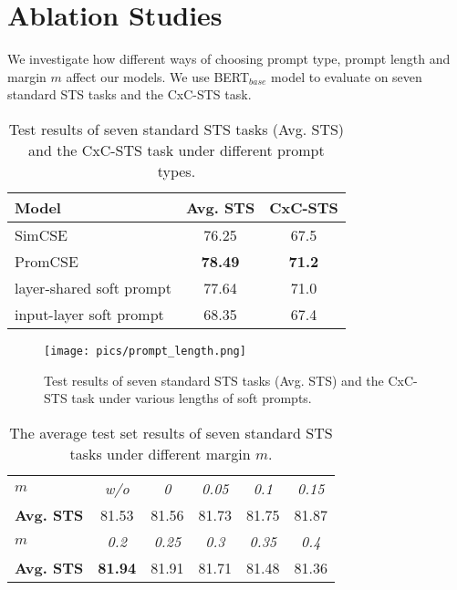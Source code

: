 \documentclass[11pt]{article}
\begin{document}
\section{Ablation Studies}
\label{sec: ablation}
We investigate how different ways of choosing prompt type, prompt length and margin $m$ affect our models. We use BERT$_{base}$ model to evaluate on seven standard STS tasks and the CxC-STS task.

\begin{table}[t]
\small
\centering
\begin{tabular}{lcc}
\toprule
\textbf{Model} &  \textbf{Avg. STS}  &  \textbf{CxC-STS}  \\
\midrule
SimCSE  & 76.25 & 67.5 \\
\midrule
PromCSE  & \textbf{78.49} & \textbf{71.2} \\
\quad  layer-shared soft prompt  & 77.64 & 71.0 \\
\quad  input-layer soft prompt & 68.35 & 67.4 \\
\bottomrule
\end{tabular}
\caption{\label{tab: prompt type}
Test results of seven standard STS tasks (Avg. STS) and the CxC-STS task under different prompt types.
}
\end{table}

\begin{figure}[htp]
	\centering 
	\texttt{[image: pics/prompt\_length.png]}
	\caption{Test results of seven standard STS tasks (Avg. STS) and the CxC-STS task under various lengths of soft prompts.}
	\label{fig: prompt length}
\end{figure}

\begin{table}[t]
\small
\centering
\begin{tabular}{lccccc}
\toprule
$m$ & \textit{w/o} & \textit{0} & \textit{0.05} & \textit{0.1} & \textit{0.15}    \\
\textbf{Avg. STS} & 81.53 & 81.56 & 81.73 & 81.75 & 81.87 \\
\midrule
$m$ & \textit{0.2} & \textit{0.25} & \textit{0.3} & \textit{0.35} & \textit{0.4}    \\
\textbf{Avg. STS} & \textbf{81.94} & 81.91 & 81.71 & 81.48 & 81.36 \\
\bottomrule
\end{tabular}
\caption{\label{tab: margin}
The average test set results of seven standard STS tasks under different margin $m$.
}
\end{table}
\end{document}
